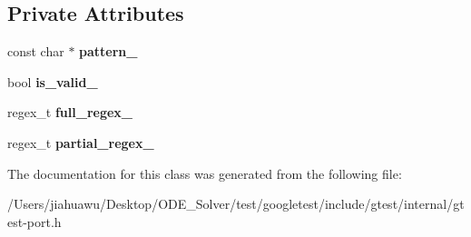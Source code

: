 \subsection*{Private Attributes}
\begin{DoxyCompactItemize}
\item 
\mbox{\label{classtesting_1_1internal_1_1_r_e_a44ab32241fab42db5b6f7482776658ec}} 
const char $\ast$ {\bfseries pattern\+\_\+}
\item 
\mbox{\label{classtesting_1_1internal_1_1_r_e_af9062fefab96529ff785f50097416d64}} 
bool {\bfseries is\+\_\+valid\+\_\+}
\item 
\mbox{\label{classtesting_1_1internal_1_1_r_e_a1627cf3c6e38a83518e7aefd659b938b}} 
regex\+\_\+t {\bfseries full\+\_\+regex\+\_\+}
\item 
\mbox{\label{classtesting_1_1internal_1_1_r_e_a1b3e42916c61db479ae90c7a96c22a58}} 
regex\+\_\+t {\bfseries partial\+\_\+regex\+\_\+}
\end{DoxyCompactItemize}


The documentation for this class was generated from the following file\+:\begin{DoxyCompactItemize}
\item 
/\+Users/jiahuawu/\+Desktop/\+O\+D\+E\+\_\+\+Solver/test/googletest/include/gtest/internal/gtest-\/port.\+h\end{DoxyCompactItemize}
